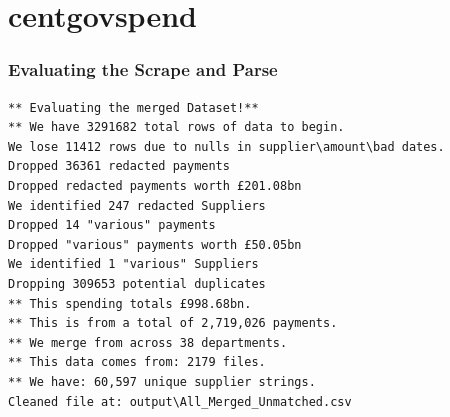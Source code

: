 \documentclass[11pt]{beamer}
\begin{document}
\section{centgovspend}

\begin{frame}[fragile]
\frametitle{Evaluating the Scrape and Parse}
\begin{verbatim}
** Evaluating the merged Dataset!**
** We have 3291682 total rows of data to begin.
We lose 11412 rows due to nulls in supplier\amount\bad dates.
Dropped 36361 redacted payments
Dropped redacted payments worth £201.08bn
We identified 247 redacted Suppliers
Dropped 14 "various" payments
Dropped "various" payments worth £50.05bn
We identified 1 "various" Suppliers
Dropping 309653 potential duplicates
** This spending totals £998.68bn.
** This is from a total of 2,719,026 payments. 
** We merge from across 38 departments.
** This data comes from: 2179 files.
** We have: 60,597 unique supplier strings.
Cleaned file at: output\All_Merged_Unmatched.csv
\end{verbatim}
\end{frame}
\end{document}
